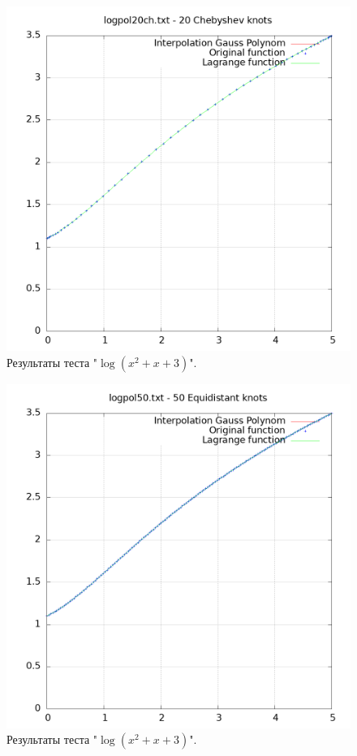 \documentclass[14pt,a4paper]{extarticle}
\newcommand{\1}{\mathbbm{1}}
\begin{document}
    \begin{figure}
        \centering
        \includegraphics[scale=0.5]{Images/logpol20ch.txt.png}
        \caption{Результаты теста "$\log(x^2 + x + 3)$".}
    \end{figure}

    \begin{figure}
        \centering
        \includegraphics[scale=0.5]{Images/logpol50.txt.png}
        \caption{Результаты теста "$\log(x^2 + x + 3)$".}
    \end{figure}
\end{document}
